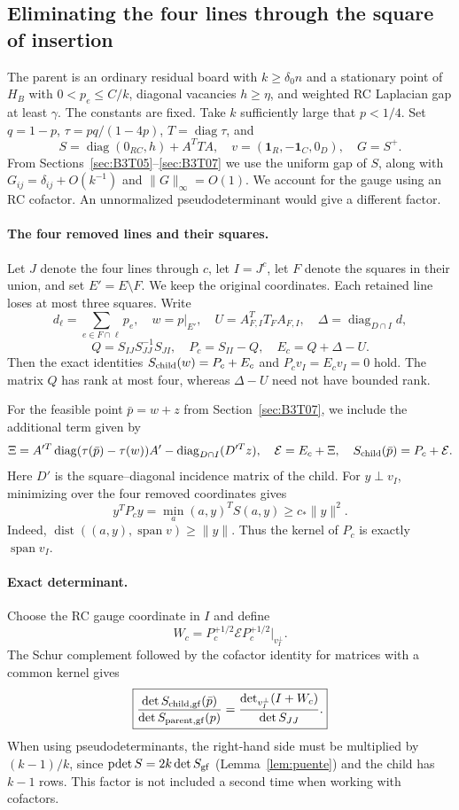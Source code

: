 \subsection{Eliminating the four lines through the square of insertion}\label{sec:B4T01}
The parent is an ordinary residual board with $k\ge\delta_0n$ and a stationary point of $H_B$ with $0<p_e\le
C/k$, diagonal vacancies $h\ge\eta$, and weighted RC Laplacian gap at least $\gamma$. The constants are
fixed.
Take $k$ sufficiently large that $p<1/4$.
Set $q=1-p$, $\tau=pq/(1-4p)$, $T=\operatorname{diag}\tau$, and
\[
 S=\operatorname{diag}(0_{RC},h)+A^TTA,\quad
 v=(\mathbf1_R,-\mathbf1_C,0_D),\quad G=S^+.
\]
From Sections~\ref{sec:B3T05}--\ref{sec:B3T07} we use the uniform gap of $S$, along with
$G_{ij}=\delta_{ij}+O(k^{-1})$ and $\|G\|_\infty=O(1)$.
We account for the gauge using an RC cofactor. An unnormalized pseudodeterminant would give a different
factor.

\paragraph{The four removed lines and their squares.}
Let $J$ denote the four lines through $c$, let $I=J^c$, let $F$ denote the squares in their union, and set
$E'=E\setminus F$. We keep the original coordinates. Each retained line loses at most three squares. Write
\[
 d_\ell=\sum_{e\in F\cap\ell}p_e,\quad w=p|_{E'},\quad
 U=A_{F,I}^TT_FA_{F,I},\quad \Delta=\operatorname{diag}_{D\cap I}d,
\]
\[
 Q=S_{IJ}S_{JJ}^{-1}S_{JI},\quad P_c=S_{II}-Q,\quad E_c=Q+\Delta-U.
\]
Then the exact identities $S_{\rm child}(w)=P_c+E_c$ and $P_cv_I=E_cv_I=0$ hold. The matrix $Q$ has rank at
most four, whereas $\Delta-U$ need not have bounded rank.

For the feasible point $\bar p=w+z$ from Section~\ref{sec:B3T07}, we include the additional term given by
\[
 \Xi=A'^T\operatorname{diag}(\tau(\bar p)-\tau(w))A'
       -\operatorname{diag}_{D\cap I}(D'^Tz),\quad
 \mathcal E=E_c+\Xi,\quad S_{\rm child}(\bar p)=P_c+\mathcal E.
\]
Here $D'$ is the square--diagonal incidence matrix of the child.
For $y\perp v_I$, minimizing over the four removed coordinates gives
\[
 y^TP_cy=\min_a(a,y)^TS(a,y)\ge c_*\|y\|^2.
\]
Indeed, $\operatorname{dist}((a,y),\operatorname{span}v)\ge\|y\|$. Thus the kernel of $P_c$ is exactly
$\operatorname{span}v_I$.

\paragraph{Exact determinant.}
Choose the RC gauge coordinate in $I$ and define
\[
 W_c=P_c^{+1/2}\mathcal E P_c^{+1/2}\big|_{v_I^\perp}.
\]
The Schur complement followed by the cofactor identity for matrices with a common kernel gives
\[
 \boxed{\frac{\det S_{{\rm child},\rm gf}(\bar p)}{\det S_{{\rm parent},\rm gf}(p)}
 =\frac{\det_{v_I^\perp}(I+W_c)}{\det S_{JJ}}.}
\]
When using pseudodeterminants, the right-hand side must be multiplied by $(k-1)/k$, since
$\operatorname{pdet}S=2k\det S_{\rm gf}$ (Lemma~\ref{lem:puente}) and the child has $k-1$ rows.
This factor is not included a second time when working with cofactors.

